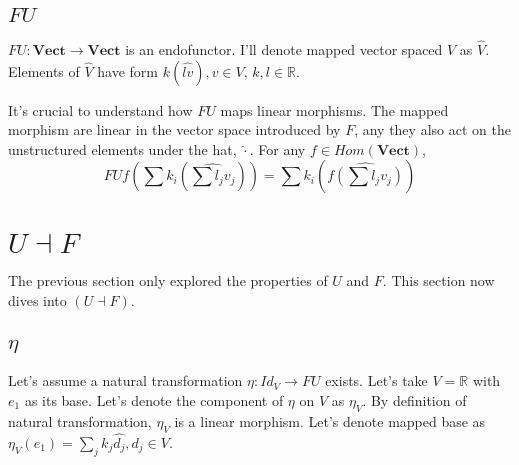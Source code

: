 \documentclass[12pt]{article}
\newcommand{\R}{\mathbb{R}}
\newcommand{\Vect}{\mathbf{Vect}}
\begin{document}
\subsection{$FU$}

$FU: \Vect \rightarrow \Vect$ is an endofunctor. I'll denote mapped vector
spaced $V$ as $\hat{V}$.  Elements of $\hat{V}$ have form $k(\hat{lv}), v \in
V, \, k, l \in \R$.

It's crucial to understand how $FU$ maps linear morphisms. The mapped morphism are linear in the vector space introduced by $F$, any they also act on the unstructured elements under the hat, $\hat{\cdot}$.
For any $f \in Hom(\Vect)$,
\[FUf\left(\sum k_i(\widehat{\sum l_j v_j})\right)
= \sum k_i \left(
                 \widehat{f \left(\sum l_j v_j \right)}
           \right) \]

\section{$U \dashv F$}

The previous section only explored the properties of $U$ and $F$. This section now dives into $(U \dashv F)$.

\subsection{$\eta$}


Let's assume a natural transformation $\eta: Id_V \rightarrow FU$ exists. Let's
take $V = \R$ with $e_1$ as its base.
Let's denote the component of $\eta$ on $V$ as $\eta_V$.
By definition of natural transformation, $\eta_V$ is a linear morphism. Let's
denote mapped base as $\eta_V(e_1) = \sum_j  k_{j}\hat{d_{j}}, d_{j} \in V$.
\end{document}
